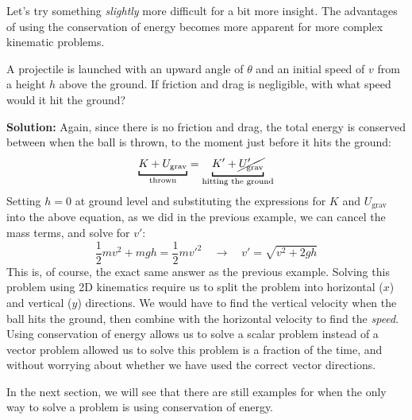 Let's try something \emph{slightly} more difficult for a bit more insight. The
advantages of using the conservation of energy becomes more apparent for more
complex kinematic problems.
\begin{example}
  \label{eg:projectile-energy-conservation}
  A projectile is launched with an upward angle of $\theta$ and an initial
  speed of $v$ from a height $h$ above the ground. If friction and drag is
  negligible, with what speed would it hit the ground?
  \begin{center}
  \end{center}
  \vspace{4pt}\textbf{Solution:} Again, since there is no friction and drag,
  the total energy is conserved between when the ball is thrown, to the moment
  just before it hits the ground:
  \begin{displaymath}
    \underbracket[1pt]{K + U_\text{grav}}_\text{thrown} =
    \underbracket[1pt]{K'+\cancel{U_\text{grav}'}}_\text{hitting the ground}
  \end{displaymath}
  Setting $h=0$ at ground level and substituting the expressions for $K$ and
  $U_\text{grav}$ into the above equation, as we did in the previous example, we
  can cancel the mass terms, and solve for $v'$:
  \begin{displaymath}
    \frac12 mv^2 + mgh = \frac12 mv'^2\quad\longrightarrow\quad
    \boxed{v'= \sqrt{v^2+2gh}}
  \end{displaymath}
  This is, of course, the exact same answer as the previous example. Solving
  this problem using 2D kinematics require us to split the problem into
  horizontal ($x$) and vertical ($y$) directions. We would have to find the
  vertical velocity when the ball hits the ground, then combine with the
  horizontal velocity to find the \emph{speed}. Using conservation of energy
  allows us to solve a scalar problem instead of a vector problem allowed us to
  solve this problem is a fraction of the time, and without worrying about
  whether we have used the correct vector directions.
\end{example}
In the next section, we will see that there are still examples for when the
only way to solve a problem is using conservation of energy.



